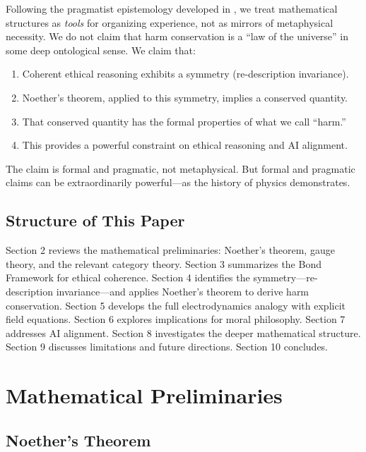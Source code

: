 \documentclass[12pt,letterpaper]{article}
\theoremstyle{definition}
\theoremstyle{remark}
\begin{document}
Following the pragmatist epistemology developed in \cite{bond2025pragmatist}, we treat mathematical structures as \textit{tools} for organizing experience, not as mirrors of metaphysical necessity. We do not claim that harm conservation is a ``law of the universe'' in some deep ontological sense. We claim that:

\begin{enumerate}
    \item Coherent ethical reasoning exhibits a symmetry (re-description invariance).
    \item Noether's theorem, applied to this symmetry, implies a conserved quantity.
    \item That conserved quantity has the formal properties of what we call ``harm.''
    \item This provides a powerful constraint on ethical reasoning and AI alignment.
\end{enumerate}

The claim is formal and pragmatic, not metaphysical. But formal and pragmatic claims can be extraordinarily powerful---as the history of physics demonstrates.

\subsection{Structure of This Paper}

Section 2 reviews the mathematical preliminaries: Noether's theorem, gauge theory, and the relevant category theory. Section 3 summarizes the Bond Framework for ethical coherence. Section 4 identifies the symmetry---re-description invariance---and applies Noether's theorem to derive harm conservation. Section 5 develops the full electrodynamics analogy with explicit field equations. Section 6 explores implications for moral philosophy. Section 7 addresses AI alignment. Section 8 investigates the deeper mathematical structure. Section 9 discusses limitations and future directions. Section 10 concludes.

\section{Mathematical Preliminaries}

\subsection{Noether's Theorem}
\end{document}
